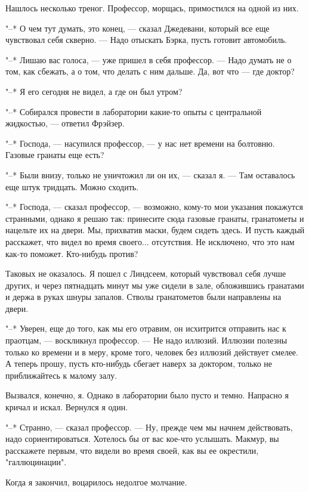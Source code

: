 Нашлось несколько треног. Профессор, морщась, примостился на  одной  из
них.

"--* О чем тут думать, это конец, ---  сказал  Джедевани,  который  все  еще
чувствовал себя скверно. --- Надо отыскать Бэрка, пусть готовит автомобиль.

"--* Лишаю вас голоса, --- уже пришел в себя профессор. --- Надо думать  не  о
том, как сбежать, а о том, что делать с ним дальше.  Да,  вот  что  ---  где
доктор?

"--* Я его сегодня не видел, а где он был утром?

"--*  Собирался  провести  в  лаборатории  какие-то  опыты  с  центральной
жидкостью, --- ответил Фрэйзер.

"--* Господа, --- насупился профессор, --- у  нас  нет  времени  на  болтовню.
Газовые гранаты еще есть?

"--* Были внизу, только  не  уничтожил  ли  он  их,  ---  сказал  я.  ---  Там
оставалось еще штук тридцать. Можно сходить.

"--* Господа,  ---  сказал  профессор,  ---  возможно,  кому-то  мои  указания
покажутся странными, однако я решаю так: принесите сюда  газовые  гранаты,
гранатометы и нацельте их на двери.  Мы,  прихватив  маски,  будем  сидеть
здесь. И пусть каждый расскажет, что видел во время своего...  отсутствия.
Не исключено, что это нам как-то поможет. Кто-нибудь против?

Таковых не оказалось. Я пошел с Линдсеем, который чувствовал себя лучше
других, и через  пятнадцать  минут  мы  уже  сидели  в  зале,  обложившись
гранатами  и  держа  в  руках  шнуры  запалов.  Стволы  гранатометов  были
направлены на двери.

"--* Уверен, еще до того, как мы его отравим, он исхитрится отправить  нас
к праотцам, --- воскликнул профессор. --- Не  надо  иллюзий.  Иллюзии  полезны
только ко времени и в меру, кроме  того,  человек  без  иллюзий  действует
смелее. А теперь прошу,  пусть  кто-нибудь  сбегает  наверх  за  доктором,
только не приближайтесь к малому залу.

Вызвался, конечно, я. Однако в лаборатории было пусто и темно. Напрасно
я кричал и искал. Вернулся я один.

"--* Странно, --- сказал профессор. --- Ну, прежде чем мы начнем  действовать,
надо сориентироваться. Хотелось бы от вас  кое-что  услышать.  Макмур,  вы
расскажете первым, что  видели  во  время  своей,  как  вы  ее  окрестили,
"галлюцинации".

Когда я закончил, воцарилось недолгое молчание.

